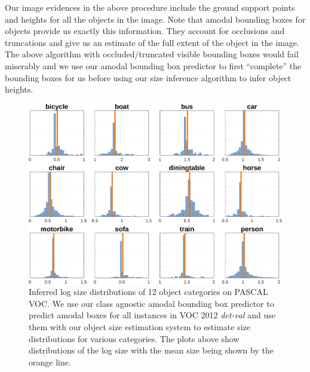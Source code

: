 Our image evidences in the above procedure include the ground support points and heights for all the objects in the image. Note that amodal bounding boxes for objects provide us exactly this information. They account for occlusions and truncations and give us an estimate of the full extent of the object in the image. The above algorithm with occluded/truncated visible bounding boxes would fail miserably and we use our amodal bounding box predictor to first ``complete'' the bounding boxes for us before using our size inference algorithm to infer object heights.

\begin{figure}[htb]
  \centering
  \includegraphics[width=.9\textwidth]{figures/amodal/size_PascalVal_pred.png}
  \caption{ Inferred log size distributions of 12 object categories on PASCAL VOC. We use our class agnostic amodal bounding box predictor to predict amodal boxes for all instances in VOC 2012 \textit{det-val} and use them with our object size estimation system to estimate size distributions for various categories. The plots above show distributions of the log size with the mean size being shown by the orange line.}
\end{figure}

